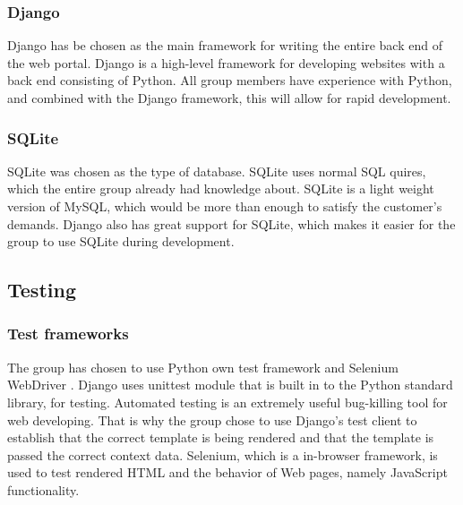 \subsubsection{Django}
Django \cite{django} has be chosen as the main framework for writing the entire back end of the web portal. Django is a high-level framework for developing websites with a back end consisting of Python. All group members have experience with Python, and combined with the Django framework, this will allow for rapid development.  

\subsubsection{SQLite}
SQLite\cite{SQLite} was chosen as the type of database. SQLite uses normal SQL quires, which the entire group already had knowledge about. SQLite is a light weight version of MySQL, which would be more than enough to satisfy the customer's demands. Django also has great support for SQLite, which makes it easier for the group to use SQLite during development.

\subsection{Testing}
\subsubsection{Test frameworks}
The group has chosen to use Python own test framework and Selenium WebDriver \cite{selenium}. Django uses unittest module that is built in to the Python standard library, for testing. Automated testing is an extremely useful bug-killing tool for web developing. That is why the group chose to use Django’s test client \cite{DjanoTestClient} to establish that the correct template is being rendered and that the template is passed the correct context data. Selenium, which is a in-browser framework, is used to test rendered HTML and the behavior of Web pages, namely JavaScript functionality.


\cleardoublepage